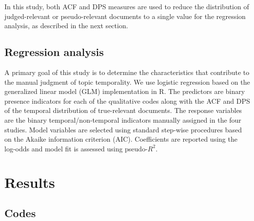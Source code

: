 \documentclass{asist}
\begin{document}
In this study, both ACF and DPS measures are used to reduce the distribution of judged-relevant or pseudo-relevant documents to a single value for the regression analysis, as described in the next section.

\subsection{Regression analysis}

A primary goal of this study is to determine the characteristics that contribute to the manual judgment of topic temporality. We use logistic regression based on the generalized linear model (GLM) implementation in R. The predictors are binary presence indicators for each of the qualitative codes along with the ACF and DPS of the temporal distribution of true-relevant documents.  The response variables are the binary temporal/non-temporal indicators manually assigned in the four studies.  Model variables are selected using standard step-wise procedures based on the Akaike information criterion (AIC). Coefficients are reported using the log-odds and model fit is assessed using pseudo-$R^2$.

\section{Results}


\subsection{Codes}
\end{document}
